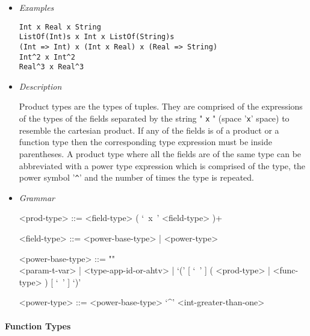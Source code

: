 \documentclass[diploma]{softlab-thesis}
\begin{document}
\begin{itemize}
\item \textit{Examples}
\begin{verbatim}
Int x Real x String
ListOf(Int)s x Int x ListOf(String)s
(Int => Int) x (Int x Real) x (Real => String)
Int^2 x Int^2
Real^3 x Real^3
\end{verbatim}

\item \textit{Description}

Product types are the types of tuples. They are comprised of the expressions of
the types of the fields separated by the string " \verb|x| " (space '\verb|x|'
space) to resemble the cartesian product. If any of the fields is of a product
or a function type then the corresponding type expression must be inside
parentheses. A product type where all the fields are of the same type can be
abbreviated with a power type expression which is comprised of the type, the
power symbol '\verb|^|' and the number of times the type is repeated.

\item \textit{Grammar}
\begin{grammar}
<prod-type> ::= <field-type> ( `\ x\ ' <field-type> )+

<field-type> ::= <power-base-type> | <power-type>

<power-base-type> ::= ""\\
<param-t-var> | <type-app-id-or-ahtv> |
`(' [ `\ ' ] ( <prod-type> | <func-type> ) [ `\ ' ] `)'

<power-type> ::= <power-base-type> `^' <int-greater-than-one>
\end{grammar}
\end{itemize}

\paragraph{Function Types}
\end{document}

